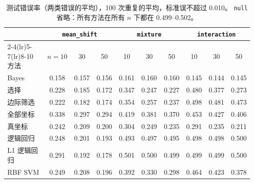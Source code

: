 \documentclass[11pt,a4paper,fontset=none]{ctexart}
\theoremstyle{definition}
\begin{document}
\begin{table}[htbp]
\centering\small
\setlength{\tabcolsep}{4.5pt}
\begin{tabular}{l*{9}{c}}
\toprule
& \multicolumn{3}{c}{\texttt{mean\_shift}} & \multicolumn{3}{c}{\texttt{mixture}} & \multicolumn{3}{c}{\texttt{interaction}}\\
\cmidrule(lr){2-4}\cmidrule(lr){5-7}\cmidrule(lr){8-10}
方法 & $n=10$ & 30 & 50 & 10 & 30 & 50 & 10 & 30 & 50\\
\midrule
Bayes & 0.158 & 0.157 & 0.156 & 0.161 & 0.160 & 0.160 & 0.145 & 0.144 & 0.145\\
选择 & 0.228 & 0.185 & 0.172 & 0.347 & 0.247 & 0.227 & 0.480 & 0.377 & 0.273\\
边际筛选 & 0.222 & 0.182 & 0.174 & 0.354 & 0.257 & 0.237 & 0.498 & 0.481 & 0.473\\
全部坐标 & 0.338 & 0.297 & 0.294 & 0.419 & 0.381 & 0.370 & 0.453 & 0.427 & 0.406\\
真坐标 & 0.242 & 0.209 & 0.200 & 0.304 & 0.249 & 0.235 & 0.291 & 0.235 & 0.211\\
逻辑回归 & 0.248 & 0.201 & 0.193 & 0.493 & 0.497 & 0.495 & 0.498 & 0.498 & 0.500\\
L1 逻辑回归 & 0.291 & 0.192 & 0.178 & 0.501 & 0.500 & 0.499 & 0.499 & 0.499 & 0.500\\
RBF SVM & 0.249 & 0.208 & 0.196 & 0.392 & 0.330 & 0.298 & 0.464 & 0.423 & 0.378\\
\bottomrule
\end{tabular}
\caption{测试错误率（两类错误的平均），100 次重复的平均，标准误不超过 0.010。
\texttt{null} 省略：所有方法在所有 $n$ 下都在 0.499--0.502。}
\label{tab:accuracy}
\end{table}
\end{document}
